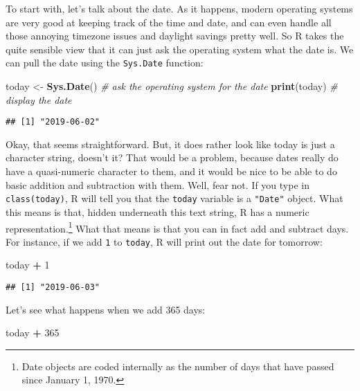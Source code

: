 \documentclass[]{book}
\newenvironment{Shaded}{\begin{snugshade}}{\end{snugshade}}
\newcommand{\CommentTok}[1]{\textcolor[rgb]{0.56,0.35,0.01}{\textit{#1}}}
\newcommand{\DecValTok}[1]{\textcolor[rgb]{0.00,0.00,0.81}{#1}}
\newcommand{\KeywordTok}[1]{\textcolor[rgb]{0.13,0.29,0.53}{\textbf{#1}}}
\newcommand{\NormalTok}[1]{#1}
\newcommand{\OperatorTok}[1]{\textcolor[rgb]{0.81,0.36,0.00}{\textbf{#1}}}
\newcommand{\StringTok}[1]{\textcolor[rgb]{0.31,0.60,0.02}{#1}}
\let\rmarkdownfootnote\footnote%
\def\footnote{\protect\rmarkdownfootnote}
\begin{document}
To start with, let's talk about the date. As it happens, modern operating systems are very good at keeping track of the time and date, and can even handle all those annoying timezone issues and daylight savings pretty well. So R takes the quite sensible view that it can just ask the operating system what the date is. We can pull the date using the \texttt{Sys.Date} function:

\begin{Shaded}
\begin{Highlighting}[]
\NormalTok{today <-}\StringTok{ }\KeywordTok{Sys.Date}\NormalTok{()  }\CommentTok{# ask the operating system for the date}
\KeywordTok{print}\NormalTok{(today)         }\CommentTok{# display the date}
\end{Highlighting}
\end{Shaded}

\begin{verbatim}
## [1] "2019-06-02"
\end{verbatim}

Okay, that seems straightforward. But, it does rather look like today is just a character string, doesn't it? That would be a problem, because dates really do have a quasi-numeric character to them, and it would be nice to be able to do basic addition and subtraction with them. Well, fear not. If you type in \texttt{class(today)}, R will tell you that the \texttt{today} variable is a \texttt{"Date"} object. What this means is that, hidden underneath this text string, R has a numeric representation.\footnote{Date objects are coded internally as the number of days that have passed since January 1, 1970.} What that means is that you can in fact add and subtract days. For instance, if we add \texttt{1} to \texttt{today}, R will print out the date for tomorrow:

\begin{Shaded}
\begin{Highlighting}[]
\NormalTok{today }\OperatorTok{+}\StringTok{ }\DecValTok{1}
\end{Highlighting}
\end{Shaded}

\begin{verbatim}
## [1] "2019-06-03"
\end{verbatim}

Let's see what happens when we add 365 days:

\begin{Shaded}
\begin{Highlighting}[]
\NormalTok{today }\OperatorTok{+}\StringTok{ }\DecValTok{365}
\end{Highlighting}
\end{Shaded}
\end{document}

